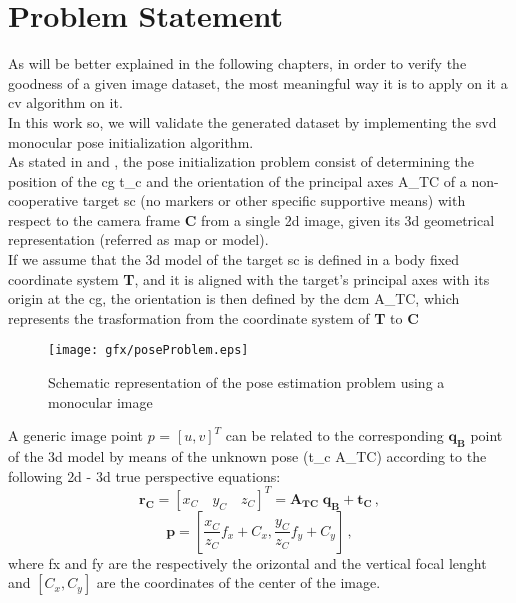 \section{Problem Statement}
As will be better explained in the following chapters, in order to verify the goodness of a given image dataset, the most meaningful way it is to apply on it a \acrshort{cv} algorithm on it.\\
In this work so, we will validate the generated dataset by implementing the \acrfull{svd} monocular pose initialization algorithm.\\
As stated in \cite{D2014} and \cite{Sharma2018}, the pose initialization problem consist of determining the position of the \acrfull{cg} \gls{t_c} and the orientation of the principal axes \gls{A_TC} of a non-cooperative target \acrshort{sc} (no markers or other specific supportive means) with respect to the camera frame \textbf{C} from a single \acrfull{2d} image, given its \acrfull{3d} geometrical representation (referred as map or model).\\
If we assume that the \acrshort{3d} model of the target \acrshort{sc} is defined in a body fixed coordinate system \textbf{T}, and it is aligned with the target's principal axes with its origin at the \acrshort{cg}, the orientation is then defined by the \acrfull{dcm} \gls{A_TC}, which represents the trasformation from the coordinate system of \textbf{T} to \textbf{C}
\begin{figure}[H]
 	\centering
 	\texttt{[image: gfx/poseProblem.eps]}
    \caption{Schematic representation of the pose estimation problem using a monocular image \cite{Sharma2018}}
    \label{fig:gyro}
\end{figure}
A generic image point $p$ = $ [u,v]^T $ can be related to the corresponding $\mathbf{q_B}$ point of the \acrshort{3d} model by means of the unknown pose (\gls{t_c} \gls{A_TC}) according to the following \acrshort{2d} - \acrshort{3d} true perspective equations: 
\begin{equation}
 \mathbf{r_C} = \left[x_C \quad  y_C \quad z_C\right]^T = \mathbf{A_{TC}} \; \mathbf{q_B} + \mathbf{t_C} \,,
\end{equation}
\begin{equation}
 \mathbf{p} = \left[ \frac{x_C}{z_C} f_x + C_x , \frac{y_C}{z_C} f_y + C_y \right] \,,
\end{equation}
where \gls{fx} and \gls{fy} are the respectively the orizontal and the vertical focal lenght and $[C_x, C_y]$ are the coordinates of the center of the image.\\
